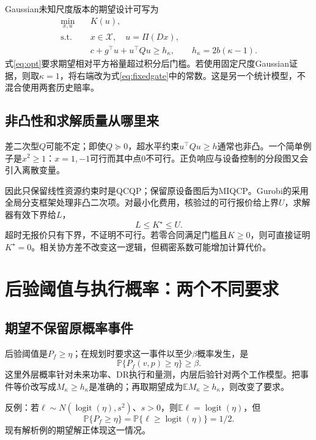 \documentclass[UTF8,11pt,a4paper,fontset=fandol]{ctexart}
\newcommand{\E}{\mathbb E}
\newcommand{\Prob}{\mathbb P}
\newcommand{\logit}{\operatorname{logit}}
\newcommand{\code}[1]{\texttt{\detokenize{#1}}}
\numberwithin{equation}{section}
\begin{document}
Gaussian未知尺度版本的期望设计可写为
\begin{equation}
\boxed{\begin{aligned}
\min_{x,u}\quad &K(u),\\
\text{s.t.}\quad &x\in\mathcal X,\quad u=\Pi(Dx),\\
&c+g^\top u+u^\top Qu\ge h_\kappa,
\qquad h_\kappa=2b(\kappa-1).
\end{aligned}}
\label{eq:opt}
\end{equation}
式\eqref{eq:opt}要求期望相对平方裕量超过积分后门槛。若使用固定尺度Gaussian证据，则取$\kappa=1$，将右端改为式\eqref{eq:fixedgate}中的常数。这是另一个统计模型，不混合使用两套历史赔率。

\subsection{非凸性和求解质量从哪里来}
差二次型$Q$可能不定；即使$Q\succeq0$，超水平约束$u^\top Qu\ge h$通常也非凸。一个简单例子是$x^2\ge1$：$x=1,-1$可行而其中点0不可行。正负响应与设备控制的分段图又会引入离散变量。

因此只保留线性资源约束时是QCQP；保留原设备图后为MIQCP。Gurobi的\code{NonConvex=2}采用全局分支框架处理非凸二次项\cite{gurobiNonConvex}。对最小化费用，核验过的可行报价给上界$U$，求解器有效下界给$L$，
\begin{equation}
L\le K^\star\le U.
\end{equation}
超时无报价只有下界，不证明不可行。若零合同满足门槛且$K\ge0$，则可直接证明$K^\star=0$。相关协方差不改变这一逻辑，但稠密系数可能增加计算代价。

\section{后验阈值与执行概率：两个不同要求}
\label{sec:probability}
\subsection{期望不保留原概率事件}
后验阈值是$P_f\ge\eta$；在规划时要求这一事件以至少$\beta$概率发生，是
\begin{equation}
\Prob\{P_f(v,p)\ge\eta\}\ge\beta.
\label{eq:chance}
\end{equation}
这里外层概率针对未来功率、DR执行和量测，内层后验针对两个工作模型。把事件等价改写成$M_\kappa\ge h_\kappa$是准确的；再取期望成为$\E M_\kappa\ge h_\kappa$，则改变了要求。

反例：若$\ell\sim N(\logit(\eta),s^2)$、$s>0$，则$\E\ell=\logit(\eta)$，但
\begin{equation}
\Prob\{P_f\ge\eta\}=\Prob\{\ell\ge\logit(\eta)\}=1/2.
\end{equation}
现有解析例的期望解正体现这一情况。
\end{document}
